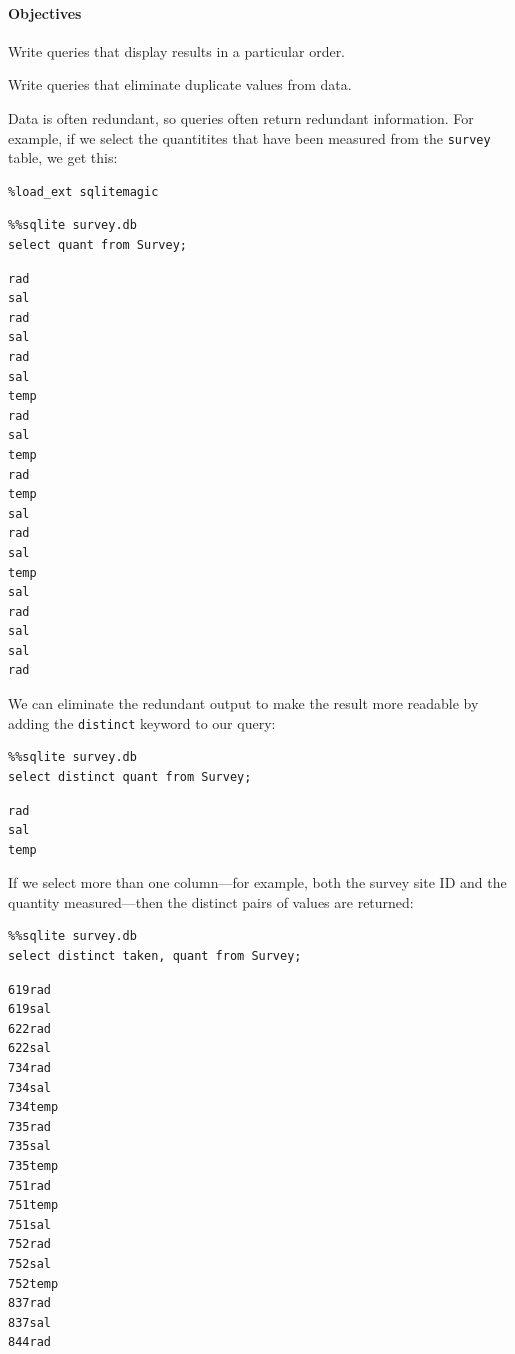 \documentclass{book}
\begin{document}
\mbox{}\paragraph{Objectives}

\begin{swcitemize}
\item
  Write queries that display results in a particular order.
\item
  Write queries that eliminate duplicate values from data.
\end{swcitemize}

Data is often redundant, so queries often return redundant information.
For example, if we select the quantitites that have been measured from
the \texttt{survey} table, we get this:

\begin{verbatim}
%load_ext sqlitemagic
\end{verbatim}

\begin{verbatim}
%%sqlite survey.db
select quant from Survey;
\end{verbatim}

\begin{verbatim}
rad
sal
rad
sal
rad
sal
temp
rad
sal
temp
rad
temp
sal
rad
sal
temp
sal
rad
sal
sal
rad
\end{verbatim}

We can eliminate the redundant output to make the result more readable
by adding the \texttt{distinct} keyword to our query:

\begin{verbatim}
%%sqlite survey.db
select distinct quant from Survey;
\end{verbatim}

\begin{verbatim}
rad
sal
temp
\end{verbatim}

If we select more than one column---for example, both the survey site ID
and the quantity measured---then the distinct pairs of values are
returned:

\begin{verbatim}
%%sqlite survey.db
select distinct taken, quant from Survey;
\end{verbatim}

\begin{verbatim}
619rad
619sal
622rad
622sal
734rad
734sal
734temp
735rad
735sal
735temp
751rad
751temp
751sal
752rad
752sal
752temp
837rad
837sal
844rad
\end{verbatim}
\end{document}
